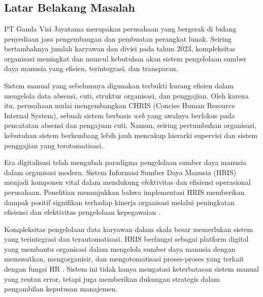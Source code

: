 \chapter{\babSatu}

\section{Latar Belakang Masalah}
PT Ganda Visi Jayatama merupakan perusahaan yang bergerak di bidang penyediaan jasa pengembangan dan pembuatan perangkat lunak. Seiring bertambahnya jumlah karyawan dan divisi pada tahun 2023, kompleksitas organisasi meningkat dan muncul kebutuhan akan sistem pengelolaan sumber daya manusia yang efisien, terintegrasi, dan transparan.

Sistem manual yang sebelumnya digunakan terbukti kurang efisien dalam mengelola data absensi, cuti, struktur organisasi, dan penggajian. Oleh karena itu, perusahaan mulai mengembangkan CHRIS (Concise Human Resource Internal System), sebuah sistem berbasis \textit{web} yang awalnya berfokus pada pencatatan absensi dan pengajuan cuti. Namun, seiring pertumbuhan organisasi, kebutuhan sistem berkembang lebih jauh mencakup hierarki supervisi dan sistem penggajian yang terotomatisasi.

Era digitalisasi telah mengubah paradigma pengelolaan sumber daya manusia dalam organisasi modern. Sistem Informasi Sumber Daya Manusia (HRIS) menjadi komponen vital dalam mendukung efektivitas dan efisiensi operasional perusahaan. Penelitian menunjukkan bahwa implementasi HRIS memberikan dampak positif signifikan terhadap kinerja organisasi melalui peningkatan efisiensi dan efektivitas pengelolaan kepegawaian \cite{khashman2016impact}.

Kompleksitas pengelolaan data karyawan dalam skala besar memerlukan sistem yang terintegrasi dan terautomatisasi. HRIS berfungsi sebagai platform digital yang membantu organisasi dalam mengelola sumber daya manusia dengan memusatkan, mengorganisir, dan mengotomatisasi proses-proses yang terkait dengan fungsi HR \cite{abdullah2023impact}. Sistem ini tidak hanya mengatasi keterbatasan sistem manual yang rentan error, tetapi juga memberikan dukungan strategis dalam pengambilan keputusan manajemen.

